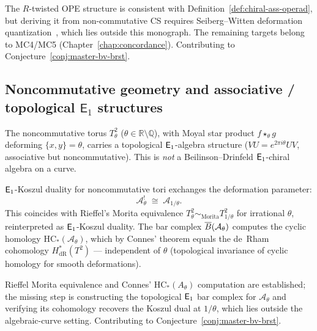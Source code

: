 \begin{remark}[Scope]
The $R$-twisted OPE structure is consistent with Definition~\ref{def:chiral-ass-operad}, but deriving it from non-commutative CS requires Seiberg--Witten deformation quantization~\cite{SW99}, which lies outside this monograph.  The remaining targets belong to MC4/MC5 (Chapter~\ref{chap:concordance}).  Contributing to Conjecture~\ref{conj:master-bv-brst}.
\end{remark}


\subsection{\texorpdfstring{Noncommutative geometry and associative / topological $\mathsf{E}_1$ structures}{Noncommutative geometry and associative / topological E1 structures}}

\begin{construction}
\label{constr:nc-torus-e1}
The noncommutative torus $T^2_\theta$ ($\theta \in \mathbb{R} \setminus \mathbb{Q}$), with Moyal star product $f \star_\theta g$ deforming $\{x,y\}=\theta$, carries a topological $\mathsf{E}_1$-algebra structure ($VU = e^{2\pi i\theta}UV$, associative but noncommutative).  This is \emph{not} a Beilinson--Drinfeld $\mathsf{E}_1$-chiral algebra on a curve.
\end{construction}

\begin{conjecture}
\label{conj:koszul-morita}
$\mathsf{E}_1$-Koszul duality for noncommutative tori exchanges the deformation parameter:
\[
\mathcal{A}_\theta^! \;\cong\; \mathcal{A}_{1/\theta}.
\]
This coincides with Rieffel's Morita equivalence $T^2_\theta \sim_{\mathrm{Morita}} T^2_{1/\theta}$
for irrational $\theta$, reinterpreted as $\mathsf{E}_1$-Koszul duality.
The bar complex $\overline{B}(\mathcal{A}_\theta)$ computes the cyclic homology
$\mathrm{HC}_*(\mathcal{A}_\theta)$, which by Connes' theorem equals the de~Rham
cohomology $H^*_{\mathrm{dR}}(T^2)$ --- independent of $\theta$ (topological invariance
of cyclic homology for smooth deformations).
\end{conjecture}

\begin{remark}[Scope]
Rieffel Morita equivalence and Connes' $\mathrm{HC}_*(A_\theta)$ computation are established; the missing step is constructing the topological $\mathsf{E}_1$ bar complex for $\mathcal{A}_\theta$ and verifying its cohomology recovers the Koszul dual at $1/\theta$, which lies outside the algebraic-curve setting.  Contributing to Conjecture~\ref{conj:master-bv-brst}.
\end{remark}


